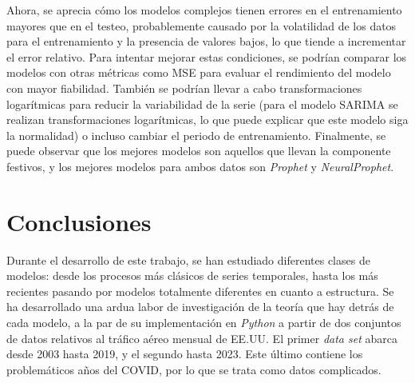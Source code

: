 \documentclass[12pt,twoside]{article}
\begin{document}
Ahora, se aprecia cómo los modelos complejos tienen errores en el entrenamiento mayores que en el testeo, probablemente causado por la volatilidad de los datos para el entrenamiento y la presencia de valores bajos, lo que tiende a incrementar el error relativo. Para intentar mejorar estas condiciones, se podrían comparar los modelos con otras métricas como MSE para evaluar el rendimiento del modelo con mayor fiabilidad. También se podrían llevar a cabo transformaciones logarítmicas para reducir la variabilidad de la serie (para el modelo SARIMA se realizan transformaciones logarítmicas, lo que puede explicar que este modelo siga la normalidad) o incluso cambiar el periodo de entrenamiento. Finalmente, se puede observar que los mejores modelos son aquellos que llevan la componente festivos, y los mejores modelos para ambos datos son \textit{Prophet} y \textit{NeuralProphet}.

\newpage

\section{Conclusiones}\label{sec:39}

Durante el desarrollo de este trabajo, se han estudiado diferentes clases de modelos: desde los procesos más clásicos de series temporales, hasta los más recientes pasando por modelos totalmente diferentes en cuanto a estructura. Se ha desarrollado una ardua labor de investigación de la teoría que hay detrás de cada modelo, a la par de su implementación en \textit{Python} a partir de dos conjuntos de datos relativos al tráfico aéreo mensual de EE.UU. El primer \textit{data set} abarca desde 2003 hasta 2019, y el segundo hasta 2023. Este último contiene los problemáticos años del COVID, por lo que se trata como datos complicados.
\end{document}
